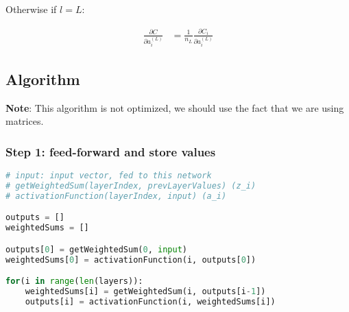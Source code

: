 \documentclass[11pt,a4paper]{report}
\begin{document}
Otherwise if $l=L$:

\begin{equation*}
\begin{split}
    \frac{\partial C}{\partial a_i^{(L)}} &= \frac{1}{n_{L}}\frac{\partial C_i}{\partial a_i^{(L)}}
\end{split}
\end{equation*}

\subsection{Algorithm}

\textbf{Note}: This algorithm is not optimized, we should use the fact that we are using matrices.

\subsubsection{Step 1: feed-forward and store values}

\begin{lstlisting}[language=Python]
# input: input vector, fed to this network
# getWeightedSum(layerIndex, prevLayerValues) (z_i)
# activationFunction(layerIndex, input) (a_i)

outputs = []
weightedSums = []

outputs[0] = getWeightedSum(0, input)
weightedSums[0] = activationFunction(i, outputs[0])

for(i in range(len(layers)):
    weightedSums[i] = getWeightedSum(i, outputs[i-1])
    outputs[i] = activationFunction(i, weightedSums[i])
\end{lstlisting}

\newpage
\end{document}
